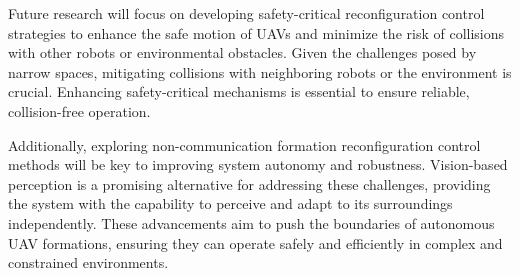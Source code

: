 Future research will focus on developing safety-critical reconfiguration control strategies to enhance the safe motion of UAVs and minimize the risk of collisions with other robots or environmental obstacles. Given the challenges posed by narrow spaces, mitigating collisions with neighboring robots or the environment is crucial. Enhancing safety-critical mechanisms is essential to ensure reliable, collision-free operation.

Additionally, exploring non-communication formation reconfiguration control methods will be key to improving system autonomy and robustness. Vision-based perception is a promising alternative for addressing these challenges, providing the system with the capability to perceive and adapt to its surroundings independently. These advancements aim to push the boundaries of autonomous UAV formations, ensuring they can operate safely and efficiently in complex and constrained environments.